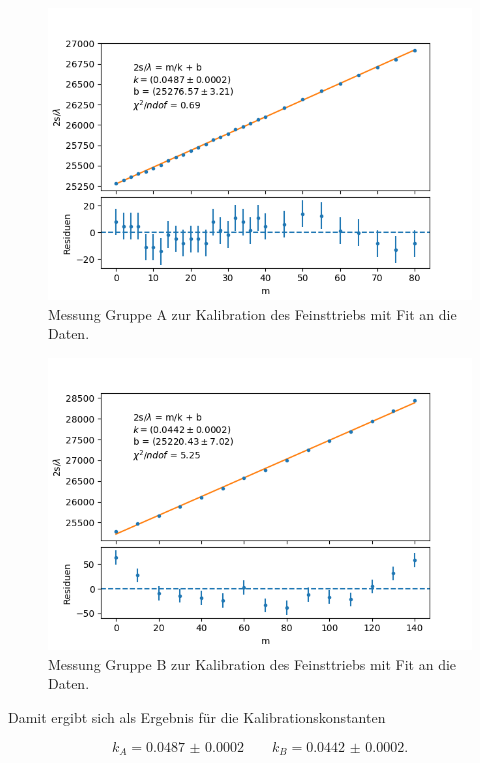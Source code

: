 \documentclass[12pt,a4paper]{article}
\begin{document}
\begin{figure}
	\centering
	\includegraphics[scale=0.8]{Bilder/Kalibration_A.png}
	\caption{Messung Gruppe A zur Kalibration des Feinsttriebs mit Fit an die Daten.}
	\label{fig:fit_kali_A}
\end{figure}
\begin{figure}
	\centering
	\includegraphics[scale=0.8]{Bilder/Kalibration_B.png}
	\caption{Messung Gruppe B zur Kalibration des Feinsttriebs mit Fit an die Daten.}
	\label{fig:fit_kali_B}
\end{figure}


Damit ergibt sich als Ergebnis für die Kalibrationskonstanten

\begin{equation}
k_A = \num{0.0487(2)} \qquad k_B = \num{0.0442(2)}.
\end{equation}
\end{document}
